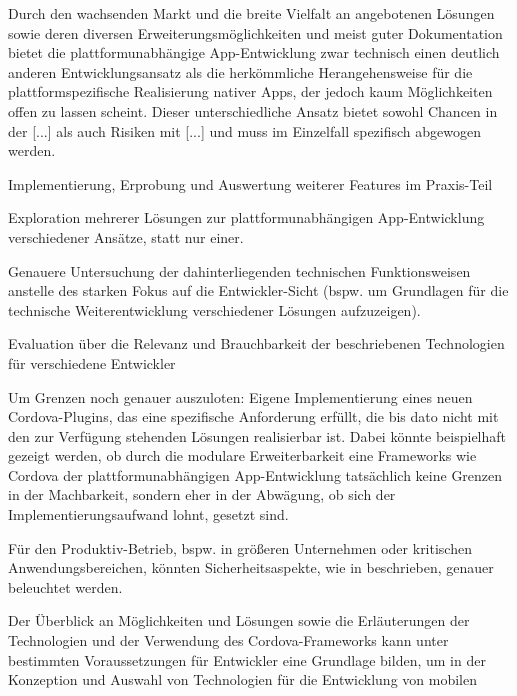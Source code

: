 
	\label{sec:schluss}


Durch den wachsenden Markt und die breite Vielfalt an angebotenen Lösungen sowie deren diversen Erweiterungsmöglichkeiten und meist guter Dokumentation bietet die plattformunabhängige App-Entwicklung zwar technisch einen deutlich anderen Entwicklungsansatz als die herkömmliche Herangehensweise für die plattformspezifische Realisierung nativer Apps, der jedoch kaum Möglichkeiten offen zu lassen scheint.
Dieser unterschiedliche Ansatz bietet sowohl Chancen in der [...] als auch Risiken mit [...] und muss im Einzelfall spezifisch abgewogen werden. 


Implementierung, Erprobung und Auswertung weiterer Features im Praxis-Teil

Exploration mehrerer Lösungen zur plattformunabhängigen App-Entwicklung verschiedener Ansätze, statt nur einer.

Genauere Untersuchung der dahinterliegenden technischen Funktionsweisen anstelle des starken Fokus auf die Entwickler-Sicht (bspw. um Grundlagen für die technische Weiterentwicklung verschiedener Lösungen aufzuzeigen).

Evaluation über die Relevanz und Brauchbarkeit der beschriebenen Technologien für verschiedene Entwickler

Um Grenzen noch genauer auszuloten: Eigene Implementierung eines neuen Cordova-Plugins, das eine spezifische Anforderung erfüllt, die bis dato nicht mit den zur Verfügung stehenden Lösungen realisierbar ist.
Dabei könnte beispielhaft gezeigt werden, ob durch die modulare Erweiterbarkeit eine Frameworks wie Cordova der plattformunabhängigen App-Entwicklung tatsächlich keine Grenzen in der Machbarkeit, sondern eher in der Abwägung, ob sich der Implementierungsaufwand lohnt, gesetzt sind.

Für den Produktiv-Betrieb, bspw. in größeren Unternehmen oder kritischen Anwendungsbereichen, könnten Sicherheitsaspekte, wie in  beschrieben, genauer beleuchtet werden. 

Der Überblick an Möglichkeiten und Lösungen sowie die Erläuterungen der Technologien und der Verwendung des Cordova-Frameworks kann unter bestimmten Voraussetzungen für Entwickler eine Grundlage bilden, um in der Konzeption und Auswahl von Technologien für die Entwicklung von mobilen 
